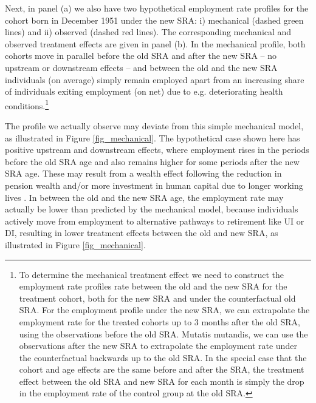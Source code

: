 \documentclass[12pt,a4paper]{article}
\begin{document}
Next, in panel (a) we also have two hypothetical employment rate profiles for the cohort born in December 1951 under the new SRA: i) mechanical (dashed green lines) and ii) observed (dashed red lines). The corresponding mechanical and observed treatment effects are given in panel (b). In the mechanical profile, both cohorts move in parallel before the old SRA and after the new SRA -- no upstream or downstream effects -- and between the old and the new SRA individuals (on average) simply remain employed apart from an increasing share of individuals exiting employment (on net) due to e.g. deteriorating health conditions.\footnote{To determine the mechanical treatment effect we need to construct the employment rate profiles rate between the old and the new SRA for the treatment cohort, both for the new SRA and under the counterfactual old SRA. For the employment profile under the new SRA, we can extrapolate the employment rate for the treated cohorts up to 3 months after the old SRA, using the observations before the old SRA. Mutatis mutandis, we can use the observations after the new SRA to extrapolate the employment rate under the counterfactual backwards up to the old SRA. In the special case that the cohort and age effects are the same before and after the SRA, the treatment effect between the old SRA and new SRA for each month is simply the drop in the employment rate of the control group at the old SRA.} 

The profile we actually observe may deviate from this simple mechanical model, as illustrated in Figure \ref{fig_mechanical}. The hypothetical case shown here has positive upstream and downstream effects, where employment rises in the periods before the old SRA age and also remains higher for some periods after the new SRA age. These may result from a wealth effect following the reduction in pension wealth \citep{gustman_steinmeijer_1986,hairault_distance_2010,van_erp_non-financial_2014} and/or more investment in human capital due to longer working lives \citep{jacobs_2010}. 
In between the old and the new SRA age, the employment rate may actually be lower than predicted by the mechanical model, because individuals actively move from employment to alternative pathways to retirement like UI or DI, resulting in lower treatment effects between the old and new SRA, as illustrated in Figure \ref{fig_mechanical}.         
\end{document}
